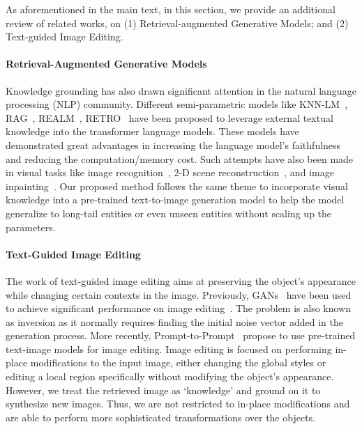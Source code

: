 \documentclass{article} \usepackage{iclr2023_conference,times}
\begin{document}
As aforementioned in the main text, in this section, we provide an additional review of related works, on (1) {Retrieval-augmented Generative Models}; and (2) {Text-guided Image Editing}.

\paragraph{Retrieval-Augmented Generative Models}
Knowledge grounding has also drawn significant attention in the natural language processing (NLP) community. Different semi-parametric models like KNN-LM~\citep{khandelwal2019generalization}, RAG~\citep{lewis2020retrieval}, REALM~\citep{pmlr-v119-guu20a}, RETRO~\citep{borgeaud2021improving} have been proposed to leverage external textual knowledge into the transformer language models. These models have demonstrated great advantages in increasing the language model's faithfulness and reducing the computation/memory cost. Such attempts have also been made in visual tasks like image recognition~\citep{long2022retrieval}, 2-D scene reconstruction~\citep{siddiqui2021retrievalfuse}, and image inpainting~\citep{xu2021texture}. Our proposed method follows the same theme to incorporate visual knowledge into a pre-trained text-to-image generation model to help the model generalize to long-tail entities or even unseen entities without scaling up the parameters. 
\paragraph{Text-Guided Image Editing}
The work of text-guided image editing aims at preserving the object's appearance while changing certain contexts in the image. Previously, GANs~\citep{goodfellow2014generative} have been used to achieve significant performance on image editing~\citep{zhu2016generative,abdal2019image2stylegan,zhu2020domain,roich2021pivotal,tov2021designing,wang2022high,alaluf2022hyperstyle}. The problem is also known as inversion as it normally requires finding the initial noise vector added in the generation process. More recently, Prompt-to-Prompt~\citep{hertz2022prompt} propose to use pre-trained text-image models for image editing. Image editing is focused on performing in-place modifications to the input image, either changing the global styles or editing a local region specifically without modifying the object's appearance. However, we treat the retrieved image as `knowledge' and ground on it to synthesize new images. Thus, we are not restricted to in-place modifications and are able to perform more sophisticated transformations over the objects. 
\end{document}
